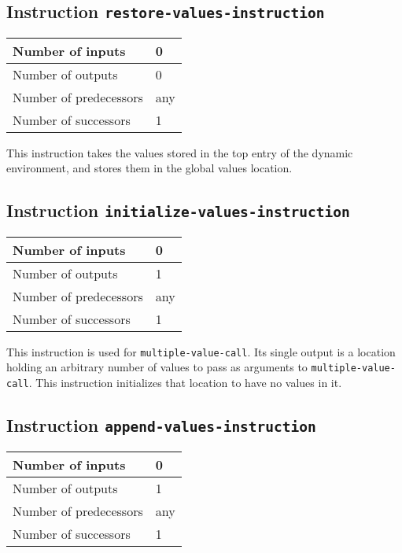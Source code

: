 \subsection{Instruction \texttt{restore-values-instruction}}
\label{hir-instruction-restore-values}

\begin{tabular}{|l|l|}
  \hline
  Number of inputs & 0\\
  \hline
  Number of outputs & 0\\
  \hline
  Number of predecessors & any\\
  \hline
  Number of successors & 1\\
  \hline
\end{tabular}

This instruction takes the values stored in the top entry of the
dynamic environment, and stores them in the global values location.

\subsection{Instruction \texttt{initialize-values-instruction}}
\label{hir-instruction-initialize-values}

\begin{tabular}{|l|l|}
  \hline
  Number of inputs & 0\\
  \hline
  Number of outputs & 1\\
  \hline
  Number of predecessors & any\\
  \hline
  Number of successors & 1\\
  \hline
\end{tabular}

This instruction is used for \texttt{multiple-value-call}.  Its single
output is a location holding an arbitrary number of values to pass as
arguments to \texttt{multiple-value-call}.  This instruction
initializes that location to have no values in it.

\subsection{Instruction \texttt{append-values-instruction}}
\label{hir-instruction-append-values}

\begin{tabular}{|l|l|}
  \hline
  Number of inputs & 0\\
  \hline
  Number of outputs & 1\\
  \hline
  Number of predecessors & any\\
  \hline
  Number of successors & 1\\
  \hline
\end{tabular}

